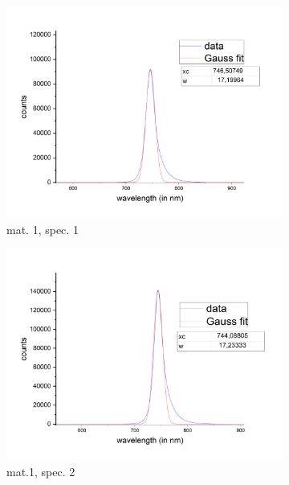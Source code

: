 \begin{figure}[!ht]
    \centering
    \begin{subfigure}{0.7\textwidth}
        \centering
        \includegraphics[width=1.0\textwidth]{img/output_t1/spekt_m1-3}
        \caption{mat. 1, spec. 1}
	      \label{fig_mono_spec1_1dspec}
    \end{subfigure}
    \begin{subfigure}{0.7\textwidth}
        \centering
        \includegraphics[width=\textwidth]{img/output_t1/spekt_m1-2-1}
        \caption{mat.1, spec. 2}
	      \label{fig_mono_spec2_1dspec}
    \end{subfigure}
    \begin{subfigure}{0.7\textwidth}

\end{subfigure}
\end{figure}
